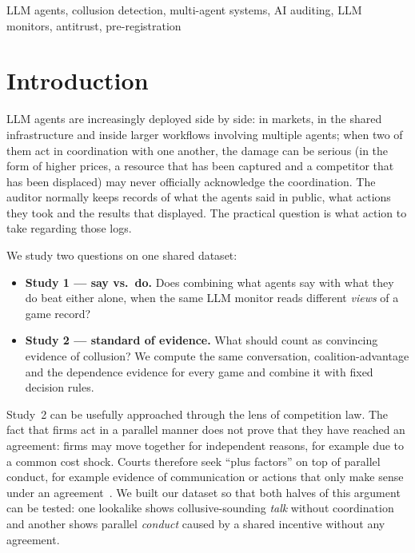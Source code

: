 \documentclass[conference]{IEEEtran}
\begin{document}
\begin{IEEEkeywords}
LLM agents, collusion detection, multi-agent systems, AI auditing, LLM monitors, antitrust, pre-registration
\end{IEEEkeywords}

\section{Introduction}

LLM agents are increasingly deployed side by side: in markets, in the shared infrastructure and inside larger
workflows involving multiple agents; when two of them act in coordination with one another, the damage can be serious (in the form of higher prices,
a resource that has been captured and a competitor that has been displaced) may never officially acknowledge the coordination.
The auditor normally keeps records of what the agents said in public, what actions they took and the results that displayed.
The practical question is what action to take regarding those logs.

We study two questions on one shared dataset:
\begin{itemize}
  \item \textbf{Study 1 --- say vs.\ do.} Does combining what agents say with what they do beat either alone, when the
  same LLM monitor reads different \emph{views} of a game record?
  \item \textbf{Study 2 --- standard of evidence.} What should count as convincing evidence of collusion? We compute the
  same conversation, coalition-advantage and the dependence evidence for every game and combine it with fixed
  decision rules.
\end{itemize}

Study~2 can be usefully approached through the lens of competition law. The fact that firms act in a parallel manner
does not prove that they have reached an agreement: firms may move together for independent reasons, for example due
to a common cost shock. Courts therefore seek ``plus factors'' on top of parallel conduct, for example evidence of
communication or actions that only make sense under an agreement~\cite{kovacic2011,twombly2007,theatre1954}. We built
our dataset so that both halves of this argument can be tested: one lookalike shows collusive-sounding \emph{talk}
without coordination and another shows parallel \emph{conduct} caused by a shared incentive without any agreement.
\end{document}
